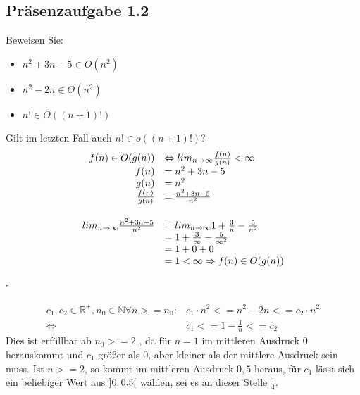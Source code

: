 \documentclass{article}
\begin{document}
\subsection{Präsenzaufgabe 1.2}
Beweisen Sie:
\begin{itemize}
	\item $n^2+3n-5 \in O(n^2)$
	\item $n^2-2n \in \Theta(n^2)$
	\item $n! \in O((n+1)!)$
\end{itemize}
Gilt im letzten Fall auch $n! \in o((n+1)!)$?\\
\vspace{1cm}
\begin{equation*}
\begin{array}{rl}
	f(n) \in O(g(n)) &\Leftrightarrow lim_{n\rightarrow \infty} \frac{f(n)}{g(n)} < \infty\\
	f(n) &= n^2+3n-5\\
	g(n) &= n^2\\
	\frac{f(n)}{g(n)} &= \frac{n^2+3n-5}{n^2}
	\vspace{0.5cm}\\
	lim_{n \rightarrow \infty} \frac{n^2+3n-5}{n^2} &= lim_{n \rightarrow \infty} 1+\frac{3}{n}-\frac{5}{n^2}\\
		&=1+\frac{3}{\infty}-\frac{5}{\infty^2}\\
		&=1+0+0\\
		&=1 < \infty \Rightarrow f(n) \in O(g(n))
\end{array}
\end{equation*}
\begin{flushright}
$\square$
\end{flushright}
\vspace{1cm}
\begin{equation*}
\begin{array}{rl}
	c_1, c_2 \in \mathbb{R}^+,n_0 \in \mathbb{N} \forall n >= n_0:	& c_1 \cdot n^2<= n^2-2n <= c_2 \cdot n^2\\
		\Leftrightarrow & c_1 <= 1-\frac{1}{n} <= c_2
\end{array}
\end{equation*}
Dies ist erfüllbar ab $n_0 >= 2$ , da für $n=1$ im mittleren Ausdruck 0 herauskommt und $c_1$ größer als 0, aber kleiner als der mittlere Ausdruck sein muss.
Ist $n >= 2$, so kommt im mittleren Ausdruck $0,5$ heraus, für $c_1$ lässt sich ein beliebiger Wert aus $\string]0;0.5\string[$ wählen, sei es an dieser Stelle $\frac{1}{4}$.
\end{document}
